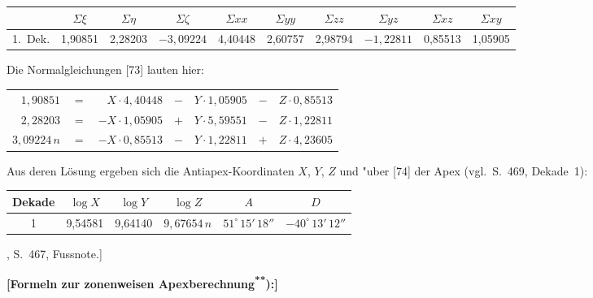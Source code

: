 \documentclass[12pt,a4paper]{article}
\theoremstyle{plain}
\theoremstyle{definition}
\theoremstyle{remark}
\begin{document}
\begin{footnotesize}
\begin{center}
\begin{tabular}{|r|c|c|c|c|c|c|c|c|c|}
\hline
[1.~Dek.] & $\Sigma\xi$ & $\Sigma\eta$ & $\Sigma\zeta$ & $\Sigma xx$ & $\Sigma yy$ & $\Sigma zz$ & $\Sigma yz$ & $\Sigma xz$ & $\Sigma xy$ \\
\hline
1.~Dek. & 1,90851 & 2,28203 & $-3{,}09224$ & 4,40448 & 2,60757 & 2,98794 & $-1{,}22811$ & 0,85513 & 1,05905 \\
\hline
\end{tabular}
\end{center}

Die Normalgleichungen [73] lauten hier:
\begin{center}
\begin{tabular}{rrrrrrr}
$1{,}90851$ & $=$ & $X\cdot 4{,}40448$ & $-$ & $Y\cdot 1{,}05905$ & $-$ & $Z\cdot 0{,}85513$ \\
$2{,}28203$ & $=$ & $-X\cdot 1{,}05905$ & $+$ & $Y\cdot 5{,}59551$ & $-$ & $Z\cdot 1{,}22811$ \\
$3{,}09224\,n$ & $=$ & $-X\cdot 0{,}85513$ & $-$ & $Y\cdot 1{,}22811$ & $+$ & $Z\cdot 4{,}23605$ \\
\end{tabular}
\end{center}

Aus deren L\"osung ergeben sich die Antiapex-Koordinaten $X$, $Y$, $Z$ und
"uber [74] der Apex (vgl.~S.~469, Dekade~1):

\begin{center}
\begin{tabular}{c|c|c|c|c|c}
Dekade & $\log X$ & $\log Y$ & $\log Z$ & $A$ & $D$ \\
\hline
1 & 9,54581 & 9,64140 & $9{,}67654\,n$ & $51^{\circ}\,15'\,18''$ & $-40^{\circ}\,13'\,12''$ \\
\end{tabular}
\end{center}
\end{footnotesize}

\begin{small}
[und die Quadratsumme der \"ubrigbleibenden Fehler
$\Omega = 6{,}86170$, vgl.~[75], S.~467, Fussnote.]

\textbf{[Formeln zur zonenweisen Apexberechnung\textsuperscript{**}):]}
\end{small}
\end{document}
